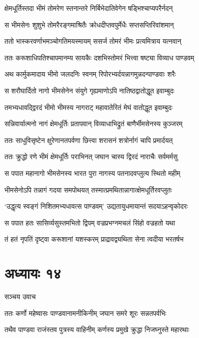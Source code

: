 \twolineshloka
{क्षेमधूर्तिस्तदा भीमं तोमरेण स्तनान्तरे}
{निर्बिभेदातिवेगेन षड्भिश्चाप्यपरैर्नदन्}


\twolineshloka
{स भीमसेनः शुशुभे तोमरैरङ्गमाश्रितैः}
{क्रोधदीप्तवपुर्मेधैः सप्तसप्तिरिवांशमान्}


\twolineshloka
{ततो भास्करवर्णाभमञ्चोगतिमयस्मायम्}
{ससर्ज तोमरं भीमः प्रत्यमित्राय यत्नवान्}


\twolineshloka
{ततः करूशाधिपतिश्चापमानम्य सायकैः}
{दशभिस्तोमरं भित्त्वा षष्ट्या विव्याध पाण्डवम्}


\twolineshloka
{अथ कार्मुकमादाय भीमो जलदनिः स्वनम्}
{रिपोरभ्यर्दयन्नागमुन्नदन्पाण्डवाः शरैः}


\twolineshloka
{स शरौघार्दितो नागो भीमसेनेन संयुगे}
{गृह्यमाणोऽपि नातिष्ठद्वातोद्धूत इवाम्बुदः}


\twolineshloka
{तमभ्यधावद्द्विरदं भीमो भीमस्य नागराट्}
{महावातेरितं मेघं वातोद्धूत इवाम्बुदः}


\twolineshloka
{सन्निवार्यात्मनो नागं क्षेमधूर्तिः प्रतापवान्}
{विव्याधाभिद्रुतं बाणैर्भीमसेनस्य कुञ्जरम्}


\twolineshloka
{ततः साधुविसृष्टेन क्षुरेणानतपर्वणा}
{छित्त्वा शरासनं शत्रोर्नागं चापि प्रमार्दयत्}


\twolineshloka
{ततः क्रुद्धो रणे भीमं क्षेमधूर्तिः पराभिनत्}
{जघान चास्य द्विरदं नाराचैः सर्वमर्मसु}


\twolineshloka
{स पपात महानागो भीमसेनस्य भारत}
{पुरा नागस्य पतनादवप्लुत्य स्थितो महीम्}


\twolineshloka
{भीमसेनोऽपि तन्नागं गदया समपोथयत्}
{तस्मात्प्रमथितान्नागात्क्षेमधूर्तिरवप्लुतः}


\twolineshloka
{`उद्धृत्य स्वङ्गं निशितमभ्यधावत्स पाण्डवम्'}
{उद्यतायुधमायान्तं सदयाऽहन्वृकोदरः}


\twolineshloka
{स पपात हतः सासिर्व्यसुस्तमभितो द्विपम्}
{वज्रप्रभग्नमचलं सिंहो वज्रहतो यथा}


\twolineshloka
{तं हतं नृपतिं दृष्ट्वा करूशानां यशस्करम्}
{प्राद्रावद्व्यथिता सेना त्वदीया भरतर्षभ}


\chapter{अध्यायः १४}
\twolineshloka
{सञ्चय उवाच}
{}


\twolineshloka
{ततः कर्णो महेष्वासः पाण्डवानामनीकिनीम्}
{जघान समरे शूरः सन्नतपर्वभिः}


\twolineshloka
{तथैव पाण्डवा राजंस्तव पुत्रस्य वाहिनीम्}
{कर्णस्य प्रमुखे क्रुद्धा निजघ्नुस्ते महारथाः}


